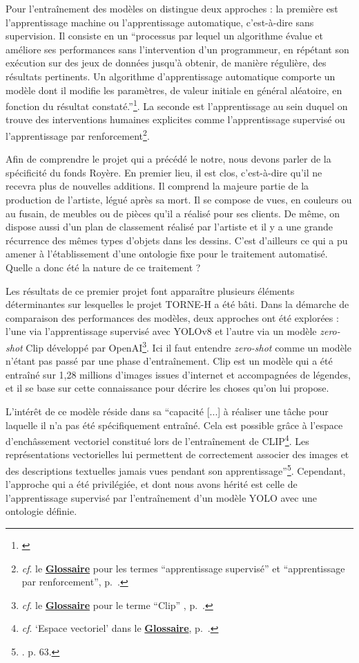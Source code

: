 \documentclass[12pt,twoside]{book}
\begin{document}
Pour l'entraînement des modèles on distingue deux approches : la première est l'apprentissage machine ou l'apprentissage automatique, c'est-à-dire sans supervision. Il consiste en un \enquote{processus par lequel un algorithme évalue et améliore ses performances sans l’intervention d’un programmeur, en répétant son exécution sur des jeux de données jusqu’à obtenir, de manière régulière, des résultats pertinents. Un algorithme d’apprentissage automatique comporte un modèle dont il modifie les paramètres, de valeur initiale en général aléatoire, en fonction du résultat constaté.}\footnote{\cite{carius_lexique_2024}}. La seconde est l'apprentissage au sein duquel on trouve des interventions humaines explicites comme l'apprentissage supervisé ou l'apprentissage par renforcement\footnote{\textit{cf}. le \textbf{\hyperref[sec:Glossaire]{Glossaire}} pour les termes \enquote{apprentissage supervisé} et \enquote{apprentissage par renforcement}, p.~\pageref{sec:Glossaire}.}.

Afin de comprendre le projet qui a précédé le notre, nous devons parler de la spécificité du fonds Royère. En premier lieu, il est clos, c'est-à-dire qu'il ne recevra plus de nouvelles additions. Il comprend la majeure partie de la production de l'artiste, légué après sa mort. Il se compose de vues, en couleurs ou au fusain, de meubles ou de pièces qu'il a réalisé pour ses clients. De même, on dispose aussi d'un plan de classement réalisé par l'artiste et il y a une grande récurrence des mêmes types d'objets dans les dessins. C'est d'ailleurs ce qui a pu amener à l'établissement d'une ontologie fixe pour le traitement automatisé. Quelle a donc été la nature de ce traitement ?

Les résultats de ce premier projet font apparaître plusieurs éléments déterminantes sur lesquelles le projet TORNE-H a été bâti. Dans la démarche de comparaison des performances des modèles, deux approches ont été explorées : l'une via l'apprentissage supervisé avec \mbox{YOLOv8} et l'autre via un modèle \textit{zero-shot} Clip développé par OpenAI\footnote{\textit{cf}. le \textbf{\hyperref[sec:Glossaire]{Glossaire}} pour le terme \enquote{Clip} , p.~\pageref{sec:Glossaire}.}. Ici il faut entendre \textit{zero-shot} comme un modèle n'étant pas passé par une phase d'entraînement. Clip est un modèle qui a été entraîné sur 1,28 millions d'images issues d'internet et accompagnées de légendes, et il se base sur cette connaissance pour décrire les choses qu'on lui propose. \hfill \break

L'intérêt de ce modèle réside dans sa \enquote{capacité [...] à réaliser une
tâche pour laquelle il n’a pas été spécifiquement entraîné. Cela est possible grâce à l’espace
d’enchâssement vectoriel constitué lors de l’entraînement de CLIP\footnote{\textit{cf}. \enquote{Espace vectoriel} dans le \textbf{\hyperref[sec:Glossaire]{Glossaire}}, p.~\pageref{sec:Glossaire}.}. Les représentations vectorielles
lui permettent de correctement associer des images et des descriptions textuelles jamais
vues pendant son apprentissage}\footnote{\cite{grim_vision_2024}. p. 63.}. Cependant, l'approche qui a été privilégiée, et dont nous avons hérité est celle de l'apprentissage supervisé par l'entraînement d'un modèle YOLO avec une ontologie définie.
\end{document}
